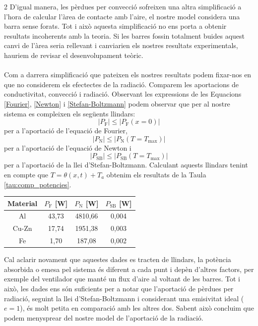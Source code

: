 \documentclass[12pt,twosides,onecolumn,openany]{article}
\newenvironment{Figura}
  {\par\medskip\noindent\minipage{\linewidth}}
  {\endminipage\par\medskip}
\begin{document}
\begin{multicols}{2}
D'igual manera, les pèrdues per convecció sofreixen una altra simplificació a l'hora de calcular l'àrea de contacte amb l'aire, el nostre model considera una barra sense forats. Tot i això aquesta simplificació no ens porta a obtenir resultats incoherents amb la teoria. Si les barres fossin totalment buides aquest canvi de l'àrea seria rellevant i canviarien els nostres resultats experimentals, hauriem de revisar el desenvolupament teòric.\\\\
Com a darrera simplificació que pateixen els nostres resultats podem fixar-nos en que no considerem els efectectes de la radiació. Comparem les aportacions de conductivitat, convecció i radiació. Observant les expressions de les Equacions \eqref{Fourier}, \eqref{Newton} i \eqref{Stefan-Boltzmann} podem observar que per al nostre sistema es compleixen els següents llindars:
\begin{equation*}
  \left|{P_{\text{F}}}\right| \leq \left| P_{\text{F}}(x=0) \right| 
\end{equation*}
per a l'aportació de l'equació de Fourier,
\begin{equation*}
  \left|P_{\text{N}} \right| \leq \left| P_{\text{N}}(T=T_{\text{max}}) \right|
\end{equation*}
per a l'aportació de l'equació de Newton i
\begin{equation*}
  \left|P_{\text{SB}} \right| \leq \left| P_{\text{SB}}(T=T_{\text{max}}) \right|
\end{equation*}
per a l'aportació de la llei d'Stefan-Boltzmann. Calculant aquests llindars tenint en compte que $T = \theta(x,t) + T_a$ obtenim els resultats de la Taula \ref{tau:comp_potencies}.
\begin{Figura}
  \centering
  \begin{tabular}{c|c|c|c}
    Material & $P_{\text{F}}$ [W] & $P_{\text{N}}$ [W] & $P_{\text{SB}}$ [W]\\ \hline\hline
    Al & 43,73 & 4810,66 & 0,004\\
    Cu-Zn & 17,74 & 1951,38 & 0,003\\
    Fe & 1,70 & 187,08 & 0,002
  \end{tabular}
  \label{tau:comp_potencies}
\end{Figura}
Cal aclarir novament que aquestes dades es tracten de llindars, la potència absorbida o emesa pel sistema és diferent a cada punt i depèn d'altres factors, per exemple del ventilador que manté un flux d'aire al voltant de les barres. Tot i això, les dades ens són suficients per a notar que l'aportació de pèrdues per radiació, seguint la llei d'Stefan-Boltzmann i considerant una emisivitat ideal ($e=1$), és molt petita en comparació amb les altres dos. Sabent això concluim que podem menysprear del nostre model de l'aportació de la radiació.

\end{multicols}
\end{document}
